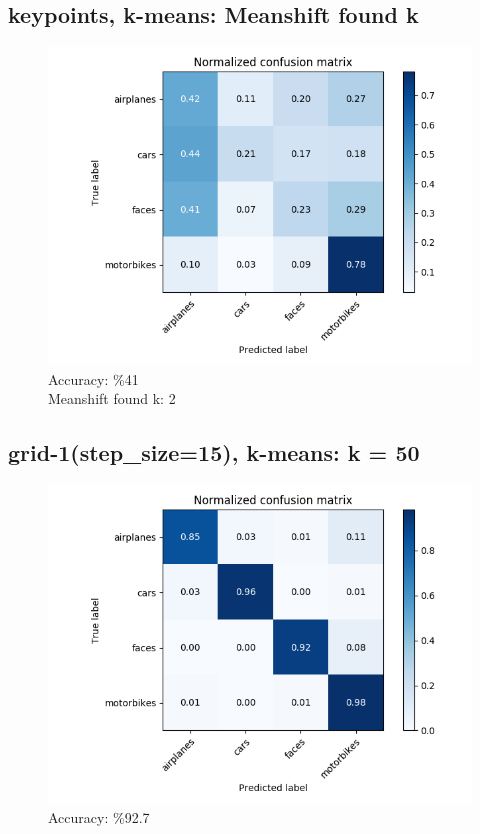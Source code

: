 \subsection*{keypoints, k-means: Meanshift found k}
\begin{figure}[H]
    \centering
    \includegraphics[scale = 0.45]{images/confusion-kp-kmeanshift.png}
    \caption*{Accuracy: \%41 \\
              Meanshift found k: 2}
\end{figure}

\subsection*{grid-1(step\_size=15), k-means: k = 50}
\begin{figure}[H]
    \centering
    \includegraphics[scale = 0.45]{images/confusion-stp-15-50.png}
    \caption*{Accuracy: \%92.7}
\end{figure}

